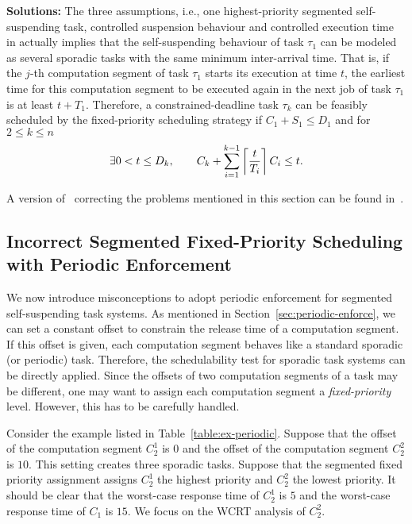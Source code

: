{\bf Solutions:} The three assumptions, i.e., one highest-priority segmented self-suspending task, controlled suspension behaviour and controlled execution time  in \cite{RTSS-KimANR13} actually implies that the self-suspending behaviour of task $\tau_1$ can be modeled as several sporadic tasks with the same minimum inter-arrival time. That is, if the $j$-th computation segment of task $\tau_1$ starts its execution at time $t$, the earliest time for this computation segment to be executed again in the next job of task $\tau_1$ is at least $t+T_1$. Therefore, a constrained-deadline task $\tau_k$ can be feasibly scheduled by the fixed-priority scheduling strategy if $C_1+S_1 \leq D_1$ and for $2 \leq k \leq n$
  \begin{equation}
    \label{eq:tda-fixed}
\exists 0 < t \leq D_k, \qquad C_k + \sum_{i=1}^{k-1}\left\lceil{\frac{t}{T_i}}\right\rceil C_i \leq t.    
  \end{equation}

A version of~\cite{RTSS-KimANR13} correcting the problems mentioned in this section can be found in~\cite{Kim2016}.

\subsection{Incorrect Segmented Fixed-Priority Scheduling with Periodic Enforcement}
\label{sec:wrong-periodic}

We now introduce misconceptions to adopt periodic enforcement for segmented self-suspending task systems. As mentioned in Section~\ref{sec:periodic-enforce}, we can set a constant offset to constrain the release time of a computation segment. If this offset is given, each computation segment behaves like a standard sporadic (or periodic) task. Therefore, the schedulability test for sporadic task systems can be directly applied. Since the offsets of two computation segments of a task may be different, one may want to assign each computation segment a \emph{fixed-priority} level.  However, this has to be carefully handled. 



Consider the example listed in Table~\ref{table:ex-periodic}. Suppose that the offset of the computation segment $C_2^1$ is $0$ and the offset of the computation segment $C_2^2$ is $10$. This setting creates three sporadic tasks.
Suppose that the segmented fixed priority assignment assigns $C_2^1$ the highest priority and $C_2^2$ the lowest priority. It should be clear that the worst-case response time of $C_2^1$ is $5$ and the worst-case response time of $C_1$ is $15$. We focus on the WCRT analysis of $C_2^2$.


